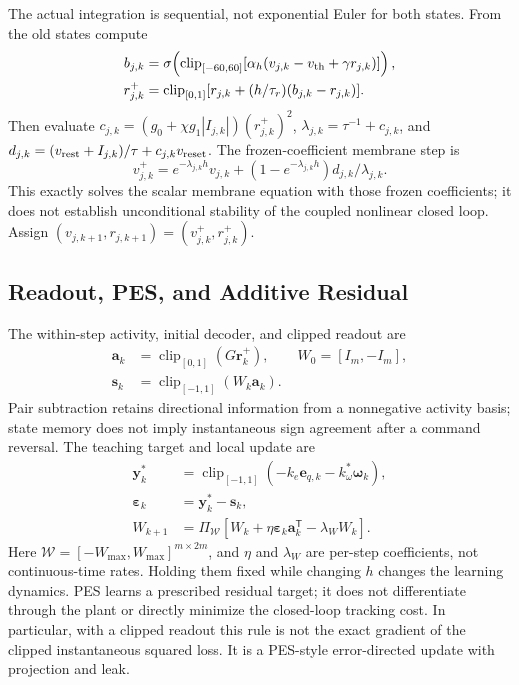 \documentclass[letterpaper,10pt,conference]{IEEEtran}
\newcommand{\T}{^{\mathsf T}}
\newcommand{\clip}{\operatorname{clip}}
\begin{document}
The actual integration is sequential, not exponential Euler for both
states. From the old states compute
\begin{align}
 b_{j,k}&=\sigma\!\left(\clip_{[-60,60]}
       [\alpha_h(v_{j,k}-v_{\rm th}+\gamma r_{j,k})]\right),\\
 r_{j,k}^{+}&=\clip_{[0,1]}
       [r_{j,k}+(h/\tau_r)(b_{j,k}-r_{j,k})].
 \label{eq:gate_step}
\end{align}
Then evaluate $c_{j,k}=(g_0+\chi g_1|I_{j,k}|)(r_{j,k}^{+})^2$,
$\lambda_{j,k}=\tau^{-1}+c_{j,k}$, and
$d_{j,k}=(v_{\rm rest}+I_{j,k})/\tau+c_{j,k}v_{\rm reset}$. The
frozen-coefficient membrane step is
\begin{equation}
 v_{j,k}^{+}=e^{-\lambda_{j,k}h}v_{j,k}
       +(1-e^{-\lambda_{j,k}h})d_{j,k}/\lambda_{j,k}.
 \label{eq:mem_step}
\end{equation}
This exactly solves the scalar membrane equation with those frozen
coefficients; it does not establish unconditional stability of the coupled
nonlinear closed loop. Assign $(v_{j,k+1},r_{j,k+1})=(v_{j,k}^{+},r_{j,k}^{+})$.

\subsection{Readout, PES, and Additive Residual}
The within-step activity, initial decoder, and clipped readout are
\begin{equation}
 \begin{aligned}
 \bm a_k&=\clip_{[0,1]}(G\bm r_k^+),\qquad W_0=[I_m,-I_m],\\
 \bm s_k&=\clip_{[-1,1]}(W_k\bm a_k).
 \end{aligned}
 \label{eq:readout}
\end{equation}
Pair subtraction retains directional information from a nonnegative
activity basis; state memory does not imply instantaneous sign agreement
after a command reversal. The teaching target and local update are
\begin{align}
 \bm y_k^*&=\clip_{[-1,1]}(-k_e\bm e_{q,k}-k_\omega^*\bm\omega_k),\\
 \bm\varepsilon_k&=\bm y_k^*-\bm s_k,\\
 W_{k+1}&=\Pi_{\mathcal W}
       [W_k+\eta\bm\varepsilon_k\bm a_k\T-\lambda_W W_k].
 \label{eq:pes}
\end{align}
Here $\mathcal W=[-W_{\max},W_{\max}]^{m\times2m}$, and
$\eta$ and $\lambda_W$ are per-step coefficients, not continuous-time
rates. Holding them fixed while changing $h$ changes the learning dynamics.
PES learns a prescribed residual target; it does not differentiate through
the plant or directly minimize the closed-loop tracking cost. In particular,
with a clipped readout this rule is not the exact gradient of the clipped
instantaneous squared loss. It is a PES-style error-directed update with
projection and leak.
\end{document}
